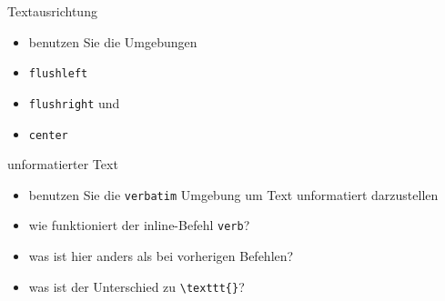 \begin{frame}[fragile]{Textausrichtung}
    \begin{itemize}
        \item benutzen Sie die Umgebungen
        \item \texttt{flushleft}
        \item \texttt{flushright} und
        \item \texttt{center}
    \end{itemize}
\end{frame}

\begin{frame}[fragile]{unformatierter Text}
    \begin{itemize}
        \item benutzen Sie die \texttt{verbatim} Umgebung um Text unformatiert darzustellen
        \item wie funktioniert der inline-Befehl \lstinline|verb|?
        \item was ist hier anders als bei vorherigen Befehlen?
        \item was ist der Unterschied zu \lstinline|\texttt{}|?
    \end{itemize}
\end{frame}